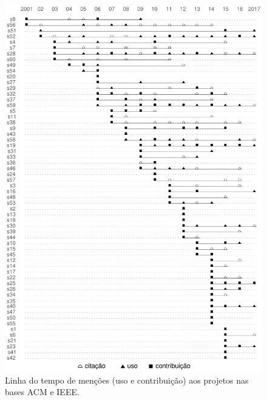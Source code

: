 \begin{figure}[h]
  \center
  \includegraphics[scale=0.6]{imagens/mentions-timeline.png}
  \caption{Linha do tempo de menções (uso e contribuição) aos projetos nas bases ACM e IEEE.}
  \label{mentions-timeline}
\end{figure}



